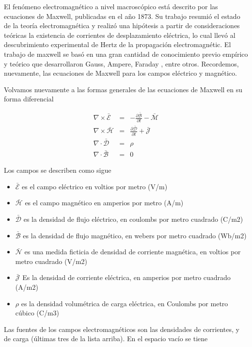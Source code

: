 El fenómeno electromagnético a nivel macroscópico está descrito por las ecuaciones de Maxwell, publicadas en el año 1873. Su trabajo resumió el estado de la teoría electromagnética y realizó una hipótesis a partir de consideraciones teóricas la existencia de corrientes de desplazamiento eléctrica, lo cual llevó al descubrimiento experimental de Hertz de la propagación electromagnétic. El trabajo de maxwell se basó en una gran cantidad de conocimiento previo empírico y teórico que desarrollaron Gauss, Ampere, Faraday , entre otros. Recordemos, nuevamente, las ecuaciones de Maxwell para los campos eléctrico y magnético.


Volvamos nuevamente a las formas generales de las ecuaciones de Maxwell en su forma diferencial

\begin{eqnarray*}
\nabla \times \mathbf{\mathcal{\bar{E}}} &=& - \frac{\partial \mathcal{\bar{B}}}{\partial t} - \mathcal{\bar{M}} \\
\nabla \times \mathbf{\mathcal{\bar{H}}} &=& \frac{\partial \mathcal{\bar{D}}}{\partial t} + \mathcal{\bar{J}} \\
\nabla \cdot \mathcal{\bar{D}} &=& \rho \\
\nabla \cdot \mathcal{\bar{B}} &=& 0
\end{eqnarray*}

Los campos se describen como sigue

\begin{itemize}
    \item $\mathcal{\bar{E}}$ es el campo eléctrico en voltios por metro (V/m)
    \item $\mathcal{\bar{H}}$ es el campo magnético en amperios por metro (A/m)
    \item $\mathcal{\bar{D}}$ es la densidad de flujo eléctrico, en coulombs por metro cuadrado (C/m2)
    \item $\mathcal{\bar{B}}$ es la densidad de flujo magnético, en webers por metro cuadrado (Wb/m2)
    \item $\mathcal{\bar{N}}$ es una medida ficticia de densidad de corriente magnética, en voltios por metro cuadrado (V/m2)
    \item $\mathcal{\bar{J}}$ Es la densidad de corriente eléctrica, en amperios por metro cuadrado (A/m2)
    \item $\rho$ es la densidad volumétrica de carga eléctrica, en Coulombs por metro cúbico (C/m3)
\end{itemize}

Las fuentes de los campos electromagnéticos son las densidades de corrientes, y de carga (últimas tres de la lista arriba). En el espacio vacío se tiene

